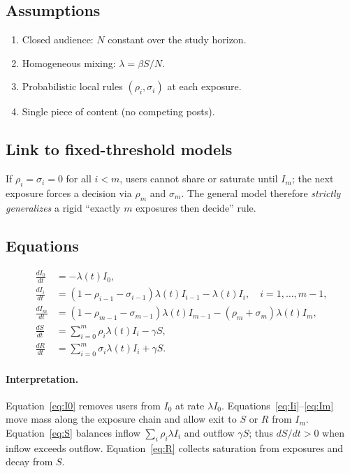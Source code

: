 \documentclass[11pt]{article}
\begin{document}
\subsection{Assumptions}

\begin{enumerate}
    \item Closed audience: $N$ constant over the study horizon.
    \item Homogeneous mixing: $\lambda=\beta S/N$.
    \item Probabilistic local rules $(\rho_i,\sigma_i)$ at each exposure.
    \item Single piece of content (no competing posts).
\end{enumerate}

\subsection{Link to fixed-threshold models}

If $\rho_i=\sigma_i=0$ for all $i<m$, users cannot share or saturate until $I_m$; the next exposure forces a decision via $\rho_m$ and $\sigma_m$. The general model therefore \emph{strictly generalizes} a rigid ``exactly $m$ exposures then decide'' rule.

\subsection{Equations}

\begin{align}
\frac{dI_0}{dt} &= -\lambda(t) I_0, \label{eq:I0}\\
\frac{dI_i}{dt} &= (1 - \rho_{i-1} - \sigma_{i-1})\lambda(t) I_{i-1} - \lambda(t) I_i, \quad i=1,\ldots,m-1, \label{eq:Ii}\\
\frac{dI_m}{dt} &= (1 - \rho_{m-1} - \sigma_{m-1})\lambda(t) I_{m-1} - (\rho_m + \sigma_m)\lambda(t) I_m, \label{eq:Im}\\
\frac{dS}{dt} &= \sum_{i=0}^{m} \rho_i \lambda(t) I_i - \gamma S, \label{eq:S}\\
\frac{dR}{dt} &= \sum_{i=0}^{m} \sigma_i \lambda(t) I_i + \gamma S. \label{eq:R}
\end{align}

\paragraph{Interpretation.} Equation~\eqref{eq:I0} removes users from $I_0$ at rate $\lambda I_0$. Equations~\eqref{eq:Ii}--\eqref{eq:Im} move mass along the exposure chain and allow exit to $S$ or $R$ from $I_m$. Equation~\eqref{eq:S} balances inflow $\sum_i \rho_i\lambda I_i$ and outflow $\gamma S$; thus $dS/dt>0$ when inflow exceeds outflow. Equation~\eqref{eq:R} collects saturation from exposures and decay from $S$.
\end{document}
